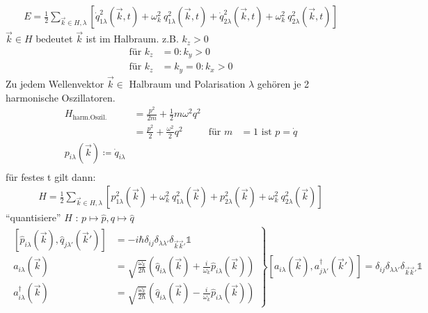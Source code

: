 		\begin{align*}
			E = \frac{1}{2} \sum_{\vec{k} \in H, \lambda}
			\left[
				\dot{q}_{1 \lambda}^2 (\vec{k} , t)
				+ \omega_k^2 ~q_{1 \lambda}^2 (\vec{k} , t)
				+ \dot{q}_{2 \lambda}^2 (\vec{k} , t)
				+ \omega_k^2 ~q_{2 \lambda}^2 (\vec{k} , t)
			\right]
		\end{align*}
	$\vec{k} \in H$ bedeutet $\vec{k}$ ist im Halbraum. z.B. $k_z > 0$
		\begin{align*}
			\text{für~} k_z &= 0 : k_y > 0 \\
			\text{für~} k_z &= k_y = 0 : k_x > 0 
		\end{align*}
	Zu jedem Wellenvektor $\vec{k} \in$ Halbraum und Polarisation $\lambda$ gehören je 2 harmonische Oszillatoren.	
		\begin{align*}
			H_{\text{harm.Oszil.}} &= 
			\frac{p^2}{2 m} + \frac{1}{2} m \omega^2 q^2 \\
			&= \frac{p^2}{2} + \frac{\omega^2}{2} q^2 
			&\text{für~} m &= 1 \text{~ist~} p = \dot{q} \\
			p_{i \lambda} (\vec{k}) \coloneqq \dot{q}_{i \lambda} \\
 		\end{align*}
 	für festes t gilt dann: 
	 	\begin{align*}
	 		H = \frac{1}{2} \sum_{\vec{k} \in H, \lambda}
	 		\left[
		 		p_{1 \lambda}^2 (\vec{k})
		 		+ \omega_k^2 ~q_{1 \lambda}^2 (\vec{k})
		 		+ p_{2 \lambda}^2 (\vec{k})
		 		+ \omega_k^2 ~q_{2 \lambda}^2 (\vec{k})
	 		\right]
	 	\end{align*}
	``quantisiere'' $H$ : $p \mapsto \hat{p} , q \mapsto \hat{q}$
		\begin{align*}
			\left.
			\begin{aligned}
			\left[ \hat{p}_{i \lambda} (\vec{k}) , \hat{q}_{j \lambda'} (\vec{k}')
			\right]
			&= -i\hbar \delta_{ij} \delta_{\lambda \lambda'} \delta_{\vec{k} \vec{k}'} \mathds{1}
			\\
			a_{i \lambda}(\vec{k}) 
			&= \sqrt{\frac{\omega_k}{2 \hbar}} 
			\left(\hat{q}_{i \lambda} (\vec{k}) + \frac{i}{\omega_k} \hat{p}_{i \lambda} (\vec{k})\right)
			\\
			a^\dagger_{i \lambda}(\vec{k})
			&= \sqrt{\frac{\omega_k}{2 \hbar}}
			\left(\hat{q}_{i \lambda} (\vec{k}) - \frac{i}{\omega_k} \hat{p}_{i \lambda} (\vec{k})\right)
			\end{aligned}
			\right\}
			\left[ a_{i \lambda} (\vec{k}) , a_{j \lambda'}^\dagger (\vec{k}')
			\right] 
			= \delta_{ij} \delta_{\lambda \lambda'} \delta_{\vec{k} \vec{k}'} \mathds{1}
		\end{align*}
